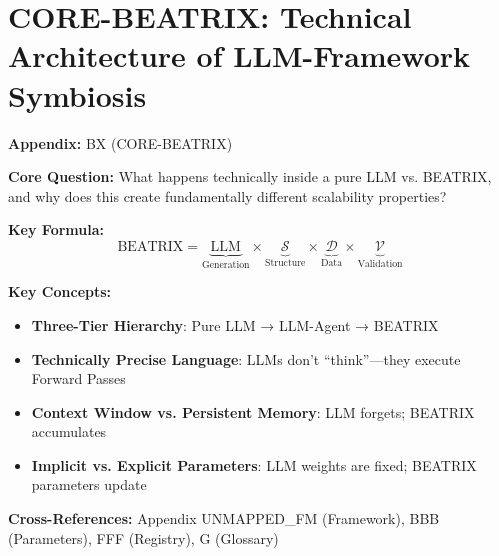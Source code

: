 \chapter{CORE-BEATRIX: Technical Architecture of LLM-Framework Symbiosis}
\label{app:core-beatrix}


\begin{tcolorbox}[colback=blue!5!white, colframe=blue!75!black,
    title=Quick Reference: Appendix UNMAPPED_BX]

\textbf{Appendix:} BX (CORE-BEATRIX)

\textbf{Core Question:} What happens technically inside a pure LLM vs. BEATRIX, and why does this create fundamentally different scalability properties?

\textbf{Key Formula:}
\begin{equation}
\text{BEATRIX} = \underbrace{\text{LLM}}_{\text{Generation}} \times \underbrace{\mathcal{S}}_{\text{Structure}} \times \underbrace{\mathcal{D}}_{\text{Data}} \times \underbrace{\mathcal{V}}_{\text{Validation}}
\label{eq:bx-core}
\end{equation}

\textbf{Key Concepts:}
\begin{itemize}[nosep]
\item \textbf{Three-Tier Hierarchy}: Pure LLM → LLM-Agent → BEATRIX
\item \textbf{Technically Precise Language}: LLMs don't ``think''---they execute Forward Passes
\item \textbf{Context Window vs. Persistent Memory}: LLM forgets; BEATRIX accumulates
\item \textbf{Implicit vs. Explicit Parameters}: LLM weights are fixed; BEATRIX parameters update
\end{itemize}

\textbf{Cross-References:} Appendix UNMAPPED_FM (Framework), BBB (Parameters), FFF (Registry), G (Glossary)
\end{tcolorbox}


\begin{abstract}
This appendix provides a technically rigorous explanation of the architectural differences between a pure Large Language Model (LLM) and BEATRIX (EBF + LLM). We introduce a \textbf{three-tier hierarchy}---Pure LLM → LLM-Agent → BEATRIX---and analyze what happens at each processing layer using \textbf{technically precise, non-anthropomorphic language} (LLMs execute Forward Passes, not ``thinking''). We identify seven fundamental asymmetries that create different scalability properties. The core insight: LLMs are \textit{stateless pattern matchers}; LLM-Agents add tool use but remain stateless; BEATRIX adds structure, data, validation, and persistence to become a \textit{stateful knowledge system}. This distinction explains why consulting insights disappear while BEATRIX knowledge accumulates.
\end{abstract}


